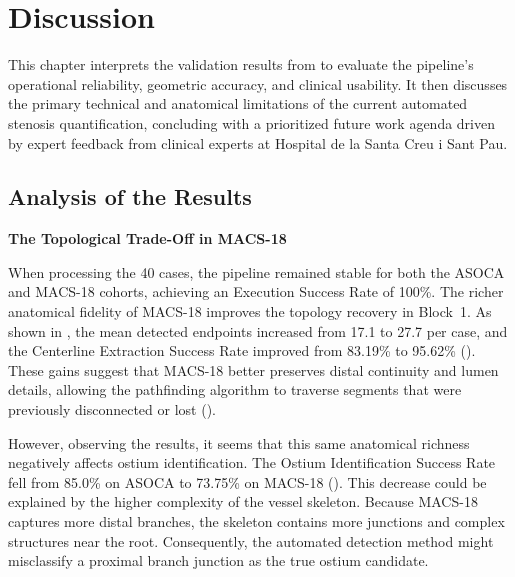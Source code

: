 \chapter{Discussion}
\label{ch:discussion}

\setlength{\parskip}{0.65em plus 0.15em minus 0.05em}
\setlength{\parindent}{0pt}

This chapter interprets the validation results from  to evaluate the pipeline's operational reliability, geometric accuracy, and clinical usability. It then discusses the primary technical and anatomical limitations of the current automated stenosis quantification, concluding with a prioritized future work agenda driven by expert feedback from clinical experts at Hospital de la Santa Creu i Sant Pau.

\section{Analysis of the Results}
\label{sec:discussion-analysis}

\noindent\textbf{The Topological Trade-Off in MACS-18}\par
\vspace{0.4em}
\noindent
When processing the 40 cases, the pipeline remained stable for both the ASOCA and MACS-18 cohorts, achieving an Execution Success Rate of 100\%. The richer anatomical fidelity of MACS-18 improves the topology recovery in Block~1. As shown in , the mean detected endpoints increased from 17.1 to 27.7 per case, and the Centerline Extraction Success Rate improved from 83.19\% to 95.62\% (). These gains suggest that MACS-18 better preserves distal continuity and lumen details, allowing the pathfinding algorithm to traverse segments that were previously disconnected or lost ().

However, observing the results, it seems that this same anatomical richness negatively affects ostium identification. The Ostium Identification Success Rate fell from 85.0\% on ASOCA to 73.75\% on MACS-18 (). This decrease could be explained by the higher complexity of the vessel skeleton. Because MACS-18 captures more distal branches, the skeleton contains more junctions and complex structures near the root. Consequently, the automated detection method might misclassify a proximal branch junction as the true ostium candidate.

